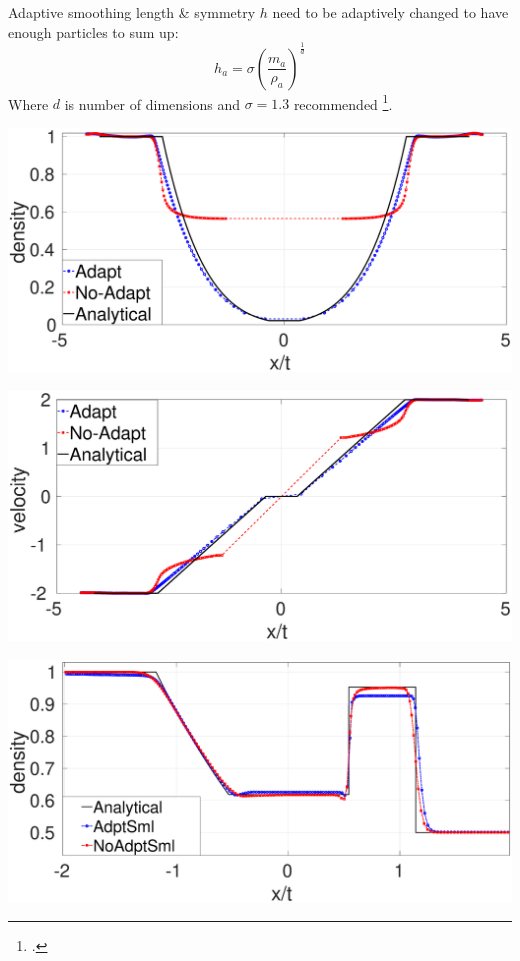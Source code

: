 \documentclass{beamer}
\begin{document}
\begin{frame}{Adaptive smoothing length \& symmetry}
$h$ need to be adaptively changed to have enough particles to sum up:
\begin{equation}
h_a = \sigma \left(\frac{m_a}{\rho_a}\right)^{\frac{1}{d}}
\end{equation}
Where $d$ is number of dimensions and $\sigma=1.3 $ recommended  \footcite{gingold1978binary}.
\center
\begin{minipage}{.32\textwidth}
        \centering
        \includegraphics[width=0.99 \textwidth]{./Chapter-3/Figures/Sjogreen-adptVSno-d}
\end{minipage}%
\begin{minipage}{.32 \textwidth}
        \centering
        \includegraphics[width=0.99 \textwidth]{./Chapter-3/Figures/Sjogreen-adptVSno-v}
\end{minipage}%
\begin{minipage}{.32\textwidth}
        \centering
        \includegraphics[width=0.99 \textwidth]{./Chapter-3/Figures/Adapt-NoAdapt-NoSMDM}

\end{minipage}
\end{frame}
\end{document}
